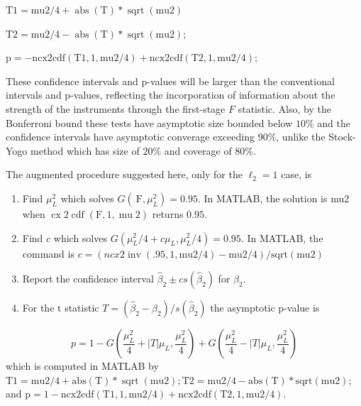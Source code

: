 \documentclass[10pt]{article}
\begin{document}
$\mathrm{T} 1=\mathrm{mu} 2 / 4+\operatorname{abs}(\mathrm{T}) * \operatorname{sqrt}(\mathrm{mu} 2)$

$\mathrm{T} 2=\mathrm{mu} 2 / 4-\operatorname{abs}(\mathrm{T}) * \operatorname{sqrt}(\mathrm{mu} 2) ;$

$\mathrm{p}=-\mathrm{ncx} 2 \mathrm{cdf}(\mathrm{T} 1,1, \mathrm{mu} 2 / 4)+\mathrm{ncx} 2 \mathrm{cdf}(\mathrm{T} 2,1, \mathrm{mu} 2 / 4)$;

These confidence intervals and p-values will be larger than the conventional intervals and p-values, reflecting the incorporation of information about the strength of the instruments through the first-stage $F$ statistic. Also, by the Bonferroni bound these tests have asymptotic size bounded below $10 \%$ and the confidence intervals have asymptotic converage exceeding $90 \%$, unlike the Stock-Yogo method which has size of $20 \%$ and coverage of $80 \%$.

The augmented procedure suggested here, only for the $\ell_{2}=1$ case, is

\begin{enumerate}
  \item Find $\mu_{L}^{2}$ which solves $G\left(\mathrm{~F}, \mu_{L}^{2}\right)=0.95$. In MATLAB, the solution is mu2 when $\operatorname{cx} 2 \operatorname{cdf}(\mathrm{F}, 1, \operatorname{mu} 2)$ returns $0.95 .$

  \item Find $c$ which solves $G\left(\mu_{L}^{2} / 4+c \mu_{L}, \mu_{L}^{2} / 4\right)=0.95$. In MATLAB, the command is $c=(n c x 2 \operatorname{inv}(.95,1, \mathrm{mu} 2 / 4)-\mathrm{mu} 2 / 4) / \mathrm{sqrt}(\mathrm{mu} 2)$

  \item Report the confidence interval $\widehat{\beta}_{2} \pm c s\left(\widehat{\beta}_{2}\right)$ for $\beta_{2}$.

  \item For the $\mathrm{t}$ statistic $T=\left(\widehat{\beta}_{2}-\beta_{2}\right) / s\left(\widehat{\beta}_{2}\right)$ the asymptotic $\mathrm{p}$-value is

\end{enumerate}
$$
p=1-G\left(\frac{\mu_{L}^{2}}{4}+|T| \mu_{L}, \frac{\mu_{L}^{2}}{4}\right)+G\left(\frac{\mu_{L}^{2}}{4}-|T| \mu_{L}, \frac{\mu_{L}^{2}}{4}\right)
$$
which is computed in MATLAB by $\mathrm{T} 1=\mathrm{mu} 2 / 4+\mathrm{abs}(\mathrm{T}) * \operatorname{sqrt}(\mathrm{mu} 2) ; \mathrm{T} 2=\mathrm{mu} 2 / 4-\mathrm{abs}(\mathrm{T}) * \mathrm{sqrt}(\mathrm{mu} 2)$; and $\mathrm{p}=1-\mathrm{ncx} 2 \mathrm{cdf}(\mathrm{T} 1,1, \mathrm{mu} 2 / 4)+\mathrm{ncx} 2 \mathrm{cdf}(\mathrm{T} 2,1, \mathrm{mu} 2 / 4)$.
\end{document}
